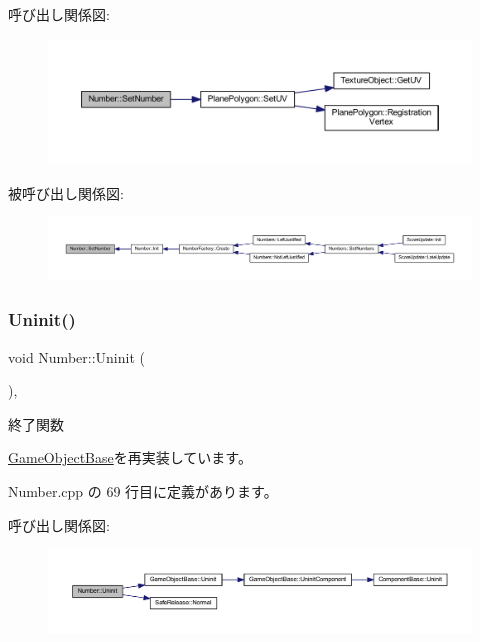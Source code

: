 呼び出し関係図\+:\nopagebreak
\begin{figure}[H]
\begin{center}
\leavevmode
\includegraphics[width=350pt]{class_number_ac825b1ee1f46a6ac4ffd3bc904964745_cgraph}
\end{center}
\end{figure}
被呼び出し関係図\+:\nopagebreak
\begin{figure}[H]
\begin{center}
\leavevmode
\includegraphics[width=350pt]{class_number_ac825b1ee1f46a6ac4ffd3bc904964745_icgraph}
\end{center}
\end{figure}
\mbox{\label{class_number_a7c3bf9c55f7a0a19d80129c5f07f99f2}} 
\subsubsection{\texorpdfstring{Uninit()}{Uninit()}}
{\footnotesize\ttfamily void Number\+::\+Uninit (\begin{DoxyParamCaption}{ }\end{DoxyParamCaption})\hspace{0.3cm}{\ttfamily [override]}, {\ttfamily [virtual]}}



終了関数 



\mbox{\hyperlink{class_game_object_base_a97e1bc277d7b1c0156d4735de29a022c}{Game\+Object\+Base}}を再実装しています。



 Number.\+cpp の 69 行目に定義があります。

呼び出し関係図\+:\nopagebreak
\begin{figure}[H]
\begin{center}
\leavevmode
\includegraphics[width=350pt]{class_number_a7c3bf9c55f7a0a19d80129c5f07f99f2_cgraph}
\end{center}
\end{figure}


